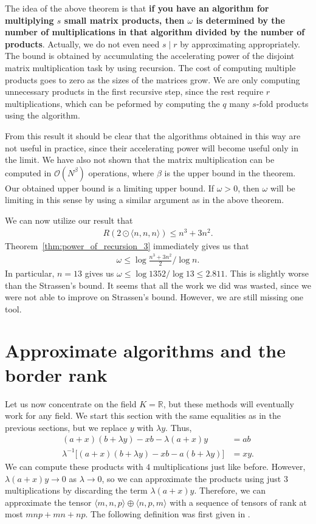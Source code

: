 \documentclass{article}
\newcommand{\R}{\mathbb{R}}
\theoremstyle{plain}
\theoremstyle{definition}
\theoremstyle{remark}
\begin{document}
The idea of the above theorem is that \textbf{if you have an algorithm for multiplying $s$ small matrix products, then $\omega$ is determined by the number of multiplications in that algorithm divided by the number of products}. Actually, we do not even need $s \mid r$ by approximating appropriately. The bound is obtained by accumulating the accelerating power of the disjoint matrix multiplication task by using recursion. The cost of computing multiple products goes to zero as the sizes of the matrices grow. We are only computing unnecessary products in the first recursive step, since the rest require $r$ multiplications, which can be peformed by computing the $q$ many $s$-fold products using the algorithm.

From this result it should be clear that the algorithms obtained in this way are not useful in practice, since their accelerating power will become useful only in the limit. We have also not shown that the matrix multiplication can be computed in $\mathcal{O}(N^\beta)$ operations, where $\beta$ is the upper bound in the theorem. Our obtained upper bound is a limiting upper bound. If $\omega > 0$, then $\omega$ will be limiting in this sense by using a similar argument as in the above theorem.

We can now utilize our result that
\begin{align*}
    R(2 \odot \langle n, n, n \rangle) \leq n^3 + 3n^2.
\end{align*}
Theorem~\ref{thm:power_of_recursion_3} immediately gives us that
\begin{align*}
    \omega \leq \log \frac{n^3 + 3n^2}{2} / \log n.
\end{align*}
In particular, $n = 13$ gives us $\omega \leq \log 1352 / \log 13 \leq 2.811$. This is slightly worse than the Strassen's bound. It seems that all the work we did was wasted, since we were not able to improve on Strassen's bound. However, we are still missing one tool.

\section{Approximate algorithms and the border rank}

Let us now concentrate on the field $K = \R$, but these methods will eventually work for any field. We start this section with the same equalities as in the previous sections, but we replace $y$ with $\lambda y$. Thus,
\begin{align*}
    (a + x)(b + \lambda y) - xb - \lambda (a + x)y &= ab \\
    \lambda^{-1} \bigg[ (a + x)(b + \lambda y) - xb - a(b + \lambda y) \bigg] &= xy.
\end{align*}
We can compute these products with $4$ multiplications just like before. However, $\lambda (a + x)y \to 0$ as $\lambda \to 0$, so we can approximate the products using just $3$ multiplications by discarding the term $\lambda (a + x)y$. Therefore, we can approximate the tensor $\langle m, n, p \rangle \oplus \langle n, p, m \rangle$ with a sequence of tensors of rank at most $mnp + mn + np$. The following definition was first given in \cite{bini1979n2}.
\end{document}
